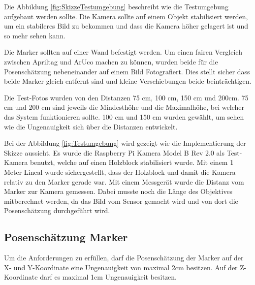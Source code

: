 Die Abbildung \ref{fig:SkizzeTestumgebung} beschreibt wie die Testumgebung aufgebaut werden sollte.
Die Kamera sollte auf einem Objekt stabilisiert werden, um ein stabileres Bild zu bekommen und dass die Kamera höher gelagert ist und so mehr sehen kann.

Die Marker sollten auf einer Wand befestigt werden. 
Um einen fairen Vergleich zwischen Apriltag und ArUco machen zu können, wurden beide für die Posenschätzung nebeneinander auf einem Bild Fotografiert.
Dies stellt sicher dass beide Marker gleich entfernt sind und kleine Verschiebungen beide beinträchtigen.

Die Test-Fotos wurden von den Distanzen 75 cm, 100 cm, 150 cm und 200cm.
75 cm und 200 cm sind jeweils die Mindesthöhe und die Maximalhöhe, bei welcher das System funktionieren sollte.
100 cm und 150 cm wurden gewählt, um sehen wie die Ungenauigkeit sich über die Distanzen entwickelt.

Bei der Abbildung \ref{fig:Testumgebung} wird gezeigt wie die Implementierung der Skizze aussieht. 
Es wurde die Raspberry Pi Kamera Model B Rev 2.0 als Test-Kamera benutzt, welche auf einen Holzblock stabilisiert wurde.
Mit einem 1 Meter Lineal wurde sichergestellt, dass der Holzblock und damit die Kamera relativ zu den Marker gerade war.
Mit einem Messgerät wurde die Distanz vom Marker zur Kamera gemessen. 
Dabei musste noch die Länge des Objektives mitberechnet werden, da das Bild vom Sensor gemacht wird und von dort die Posenschätzung durchgeführt wird.

\subsection{Posenschätzung Marker}
\label{sec:EvaluationPosen}

Um die Anforderungen zu erfüllen, darf die Posenschätzung der Marker auf der X- und Y-Koordinate eine Ungenauigkeit von maximal 2cm besitzen. 
Auf der Z-Koordinate darf es maximal 1cm Ungenauigkeit besitzen.

